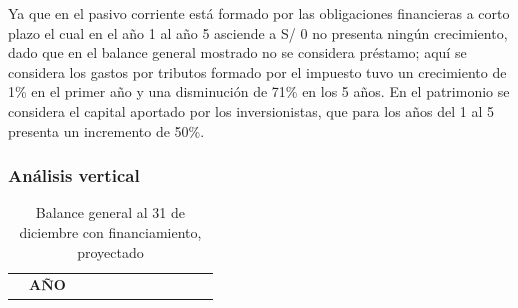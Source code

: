 \documentclass[
  stu,
  floatsintext,
  longtable,
  a4paper,
  nolmodern,
  notxfonts,
  notimes,
  12pt,
  colorlinks=true,linkcolor=blue,citecolor=blue,urlcolor=blue]{apa7}
\begin{document}
Ya que en el pasivo corriente está formado por las obligaciones
financieras a corto plazo el cual en el año 1 al año 5 asciende a S/ 0
no presenta ningún crecimiento, dado que en el balance general mostrado
no se considera préstamo; aquí se considera los gastos por tributos
formado por el impuesto tuvo un crecimiento de 1\% en el primer año y
una disminución de 71\% en los 5 años. En el patrimonio se considera el
capital aportado por los inversionistas, que para los años del 1 al 5
presenta un incremento de 50\%.

\subsubsection{Análisis vertical}\label{anuxe1lisis-vertical}

\begin{longtable}[]{@{}
  >{\raggedright\arraybackslash}p{}
  >{\centering\arraybackslash}p{}
  >{\centering\arraybackslash}p{}
  >{\centering\arraybackslash}p{}
  >{\centering\arraybackslash}p{}
  >{\centering\arraybackslash}p{}
  >{\raggedright\arraybackslash}p{}
  >{\centering\arraybackslash}p{}
  >{\centering\arraybackslash}p{}
  >{\centering\arraybackslash}p{}
  >{\centering\arraybackslash}p{}
  >{\centering\arraybackslash}p{}@{}}
\caption{Balance general al 31 de diciembre con financiamiento,
proyectado}\tabularnewline
\toprule\noalign{}
\begin{minipage}[b]{\linewidth}\raggedright
\end{minipage} & \begin{minipage}[b]{\linewidth}\centering
\textbf{AÑO}
\end{minipage} & \begin{minipage}[b]{\linewidth}\centering
\end{minipage} & \begin{minipage}[b]{\linewidth}\centering
\end{minipage} & \begin{minipage}[b]{\linewidth}\centering
\end{minipage} & \begin{minipage}[b]{\linewidth}\centering

\end{minipage}
\end{longtable}
\end{document}
